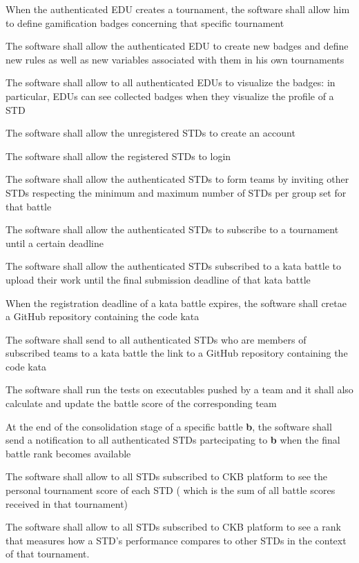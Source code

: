 \begin{requirementsenumerate}
        \item When the authenticated EDU creates a tournament, the software shall allow him to define gamification badges concerning that specific tournament 
        \item The software shall allow the authenticated EDU to create new badges and define new rules as well as new variables associated with them in his own tournaments
        \item The software shall allow to all authenticated EDUs to visualize the badges: in particular, EDUs can see collected badges when they visualize the profile of a STD
        \item The software shall allow the unregistered STDs to create an account
        \item The software shall allow the registered STDs to login
        \item The software shall allow the authenticated STDs to form teams by inviting other STDs respecting the minimum and maximum number of STDs per group set for that battle
        \item The software shall allow the authenticated STDs to subscribe to a tournament until a certain deadline
        \item The software shall allow the authenticated STDs subscribed to a kata battle to upload their work until the final submission deadline of that kata battle
        \item When the registration deadline of a kata battle expires, the software shall cretae a GitHub repository containing the code kata
        \item The software shall send to all authenticated STDs who are members of subscribed teams to a kata battle the link to a GitHub repository containing the code kata
        \item The software shall run the tests on executables pushed by a team and it shall also calculate and update the battle score of the corresponding team 
        \item At the end of the consolidation stage of a specific battle \textbf{b}, the software shall send a notification to all authenticated STDs partecipating to \textbf{b} when the final battle rank becomes available
        \item The software shall allow to all STDs subscribed to CKB platform to see the personal tournament score of each STD ( which is the sum of all battle scores received in that tournament) 
        \item The software shall allow to all STDs subscribed to CKB platform to see a rank that measures how a STD's performance compares to other STDs in the context of that tournament. 

\end{requirementsenumerate}
